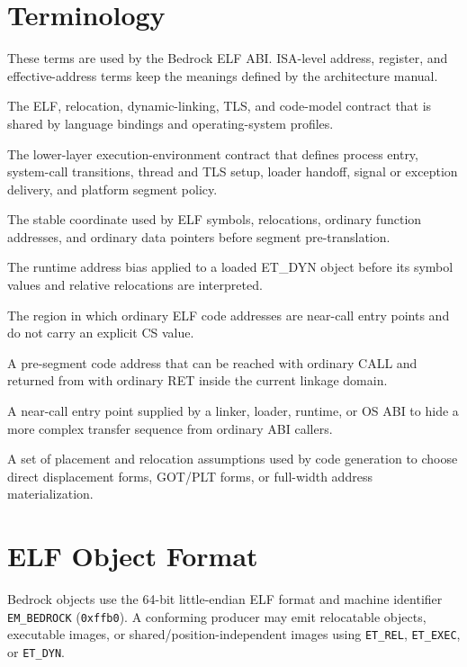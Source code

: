 \documentclass[10pt,twoside]{article}
\begin{document}
\section{Terminology}\label{page:terminology}
These terms are used by the Bedrock ELF ABI. ISA-level address, register, and effective-address terms keep the meanings defined by the architecture manual.
\begin{description}[style=nextline,leftmargin=1.45in,labelwidth=1.35in,itemsep=3pt,topsep=3pt]
\item[ELF ABI] The ELF, relocation, dynamic-linking, TLS, and code-model contract that is shared by language bindings and operating-system profiles.
\item[platform/runtime environment ABI] The lower-layer execution-environment contract that defines process entry, system-call transitions, thread and TLS setup, loader handoff, signal or exception delivery, and platform segment policy.
\item[pre-segment virtual address] The stable coordinate used by ELF symbols, relocations, ordinary function addresses, and ordinary data pointers before segment pre-translation.
\item[load base] The runtime address bias applied to a loaded ET\_DYN object before its symbol values and relative relocations are interpreted.
\item[ABI-visible linkage domain] The region in which ordinary ELF code addresses are near-call entry points and do not carry an explicit CS value.
\item[near-call entry address] A pre-segment code address that can be reached with ordinary CALL and returned from with ordinary RET inside the current linkage domain.
\item[veneer] A near-call entry point supplied by a linker, loader, runtime, or OS ABI to hide a more complex transfer sequence from ordinary ABI callers.
\item[code model] A set of placement and relocation assumptions used by code generation to choose direct displacement forms, GOT/PLT forms, or full-width address materialization.
\end{description}

\clearpage
\section{ELF Object Format}\label{page:elf-object-format}
Bedrock objects use the 64-bit little-endian ELF format and machine identifier
\texttt{EM\_\allowbreak{}BEDROCK} (\texttt{0xffb0}). A conforming producer may
emit relocatable objects, executable images, or shared/position-independent
images using \texttt{ET\_REL}, \texttt{ET\_EXEC}, or \texttt{ET\_DYN}.
\end{document}
